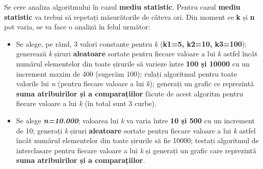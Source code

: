 \documentclass[../ro-fa-lab.tex]{subfiles}
\begin{document}
Se cere analiza algoritmului în cazul \textbf{mediu statistic}. Pentru
cazul \textbf{mediu statistic} va trebui să repetați măsurătorile de
câteva ori. Din moment ce \textbf{k} și \textbf{n} pot varia, se va face
o analiză în felul următor:

\begin{itemize}
\item
  Se alege, pe rând, 3 valori constante pentru \emph{k} (\textbf{k1=5,
  k2=10, k3=100}); generează \emph{k} șiruri \textbf{aleatoare} sortate
  pentru fiecare valoare a lui \emph{k} astfel încât numărul elementelor
  din toate șirurile să varieze între \textbf{100 și 10000} cu un
  increment maxim de 400 (sugerăm 100); rulați algoritmul pentru toate
  valorile lui \emph{n} (pentru fiecare valoare a lui \emph{k});
  generați un grafic ce reprezintă \textbf{suma atribuirilor și a
  comparațiilor} făcute de acest algoritm pentru fiecare valoare a lui
  \emph{k} (în total sunt 3 curbe).
\item
  Se alege \emph{\textbf{n=10.000}}; valoarea lui \emph{k} va varia
  între \textbf{10 și 500} cu un increment de 10; generați \emph{k}
  șiruri \textbf{aleatoare} sortate pentru fiecare valoare a lui
  \emph{k} astfel încât numărul elementelor din toate șirurile să fie
  10000; testați algoritmul de interclasare pentru fiecare valoare a lui
  \emph{k} și generați un grafic care reprezintă \textbf{suma
  atribuirilor și a comparațiilor}.
\end{itemize}
\end{document}
